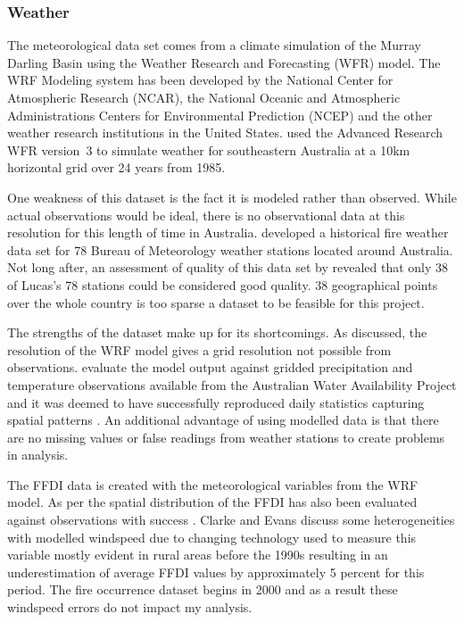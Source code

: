 \documentclass[11pt,a4paper]{article}
\begin{document}
\subsubsection{Weather}

The meteorological data set comes from a climate simulation of the Murray Darling Basin using the Weather Research and Forecasting (WFR) model. The WRF Modeling system has been developed by the National Center for Atmospheric Research (NCAR), the National Oceanic and Atmospheric Administrations Centers for Environmental Prediction (NCEP) and the other weather research institutions in the United States. \citet{evans10} used the Advanced Research WFR version~3 \citep{skamarock08} to simulate weather for southeastern Australia at a 10km horizontal grid over 24 years from 1985.

One weakness of this dataset is the fact it is modeled rather than observed. While actual observations would be ideal, there is no observational data at this resolution for this length of time in Australia. \citet{lucas10} developed a historical fire weather data set for 78 Bureau of Meteorology weather stations located around Australia. Not long after, an assessment of quality of this data set by \citet{clarke2013} revealed that only 38 of Lucas's 78 stations could be considered good quality. 38 geographical points over the whole country is too sparse a dataset to be feasible for this project.

The strengths of the dataset make up for its shortcomings. As discussed, the resolution of the WRF model gives a grid resolution not possible from observations. \citet{evans10} evaluate the model output against gridded precipitation and temperature observations available from the Australian Water Availability Project and it was deemed to have successfully reproduced daily statistics capturing spatial patterns  \citep{evans10, clarkeevans13}. An additional advantage of using modelled data is that there are no missing values or false readings from weather stations to create problems in analysis.

The FFDI data is created with the meteorological variables from the WRF model. As per \citet{clarkeevans13} the spatial distribution of the FFDI has also been evaluated against observations with success  \citep{sanabria13}. Clarke and Evans discuss some heterogeneities with modelled windspeed due to changing technology used to measure this variable mostly evident in rural areas before the 1990s resulting in an underestimation of average FFDI values by approximately 5 percent for this period. The fire occurrence dataset begins in 2000 and as a result these windspeed errors do not impact my analysis.
\end{document}
